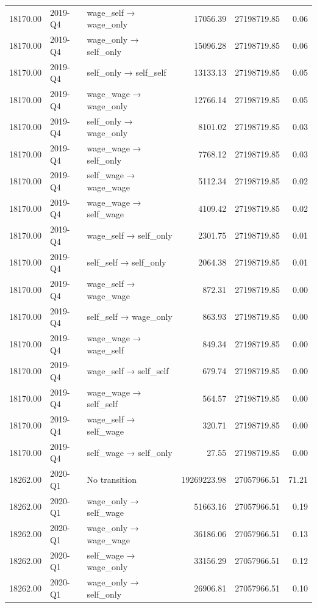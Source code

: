 \begin{table}[ht]
{\begin{tabular}{rllrrr}
  18170.00 & 2019-Q4 & wage\_self → wage\_only & 17056.39 & 27198719.85 & 0.06 \\ 
  18170.00 & 2019-Q4 & wage\_only → self\_only & 15096.28 & 27198719.85 & 0.06 \\ 
  18170.00 & 2019-Q4 & self\_only → self\_self & 13133.13 & 27198719.85 & 0.05 \\ 
  18170.00 & 2019-Q4 & wage\_wage → wage\_only & 12766.14 & 27198719.85 & 0.05 \\ 
  18170.00 & 2019-Q4 & self\_only → wage\_only & 8101.02 & 27198719.85 & 0.03 \\ 
  18170.00 & 2019-Q4 & wage\_wage → self\_only & 7768.12 & 27198719.85 & 0.03 \\ 
  18170.00 & 2019-Q4 & self\_wage → wage\_wage & 5112.34 & 27198719.85 & 0.02 \\ 
  18170.00 & 2019-Q4 & wage\_wage → self\_wage & 4109.42 & 27198719.85 & 0.02 \\ 
  18170.00 & 2019-Q4 & wage\_self → self\_only & 2301.75 & 27198719.85 & 0.01 \\ 
  18170.00 & 2019-Q4 & self\_self → self\_only & 2064.38 & 27198719.85 & 0.01 \\ 
  18170.00 & 2019-Q4 & wage\_self → wage\_wage & 872.31 & 27198719.85 & 0.00 \\ 
  18170.00 & 2019-Q4 & self\_self → wage\_only & 863.93 & 27198719.85 & 0.00 \\ 
  18170.00 & 2019-Q4 & wage\_wage → wage\_self & 849.34 & 27198719.85 & 0.00 \\ 
  18170.00 & 2019-Q4 & wage\_self → self\_self & 679.74 & 27198719.85 & 0.00 \\ 
  18170.00 & 2019-Q4 & wage\_wage → self\_self & 564.57 & 27198719.85 & 0.00 \\ 
  18170.00 & 2019-Q4 & wage\_self → self\_wage & 320.71 & 27198719.85 & 0.00 \\ 
  18170.00 & 2019-Q4 & self\_wage → self\_only & 27.55 & 27198719.85 & 0.00 \\ 
  18262.00 & 2020-Q1 & No transition & 19269223.98 & 27057966.51 & 71.21 \\ 
  18262.00 & 2020-Q1 & wage\_only → self\_wage & 51663.16 & 27057966.51 & 0.19 \\ 
  18262.00 & 2020-Q1 & wage\_only → wage\_wage & 36186.06 & 27057966.51 & 0.13 \\ 
  18262.00 & 2020-Q1 & self\_wage → wage\_only & 33156.29 & 27057966.51 & 0.12 \\ 
  18262.00 & 2020-Q1 & wage\_only → self\_only & 26906.81 & 27057966.51 & 0.10 \\ 

\end{tabular}}
\end{table}
